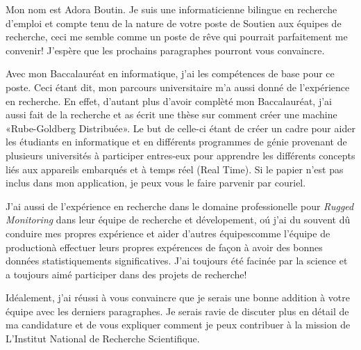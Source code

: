 \documentclass[a4paper,12pt]{article}
\begin{document}

\begin{coverletter}
    Mon nom est Adora Boutin. Je suis une informaticienne bilingue en recherche d’emploi et compte tenu de la nature de votre poste de Soutien aux équipes de recherche, ceci me semble comme un poste de rêve qui pourrait parfaitement me convenir! J’espère que les prochains paragraphes pourront vous convaincre. \par

    Avec mon Baccalauréat en informatique, j’ai les compétences de base pour ce poste. Ceci étant dit, mon parcours universitaire m’a aussi donné de l’expérience en recherche. En effet, d'autant plus d'avoir complèté mon Baccalauréat, j’ai aussi fait de la recherche et as écrit une thèse sur comment créer une machine «Rube-Goldberg Distribuée». Le but de celle-ci étant de créer un cadre pour aider les étudiants en informatique et en différents programmes de génie provenant de plusieurs universités à participer entres-eux pour apprendre les différents concepts liés aux appareils embarqués et à temps réel (Real Time). Si le papier n’est pas inclus dans mon application, je peux vous le faire parvenir par couriel. \par 

    J'ai aussi de l'expérience en recherche dans le domaine professionelle pour \textit{Rugged Monitoring} dans leur équipe de recherche et dévelopement, oú j'ai du souvent dû conduire mes propres expérience et aider d'autres équipes\textemdash comme l'équipe de production\textemdash à effectuer leurs propres expérences de façon à avoir des bonnes données statistiquements significatives. J'ai toujours été facinée par la science et a toujours aimé participer dans des projets de recherche! \par

    Idéalement, j’ai réussi à vous convaincre que je serais une bonne addition à votre équipe avec les derniers paragraphes. Je serais ravie de discuter plus en détail de ma candidature et de vous expliquer comment je peux contribuer à la mission de L'Institut National de Recherche Scientifique.
\end{coverletter}
\end{document}
